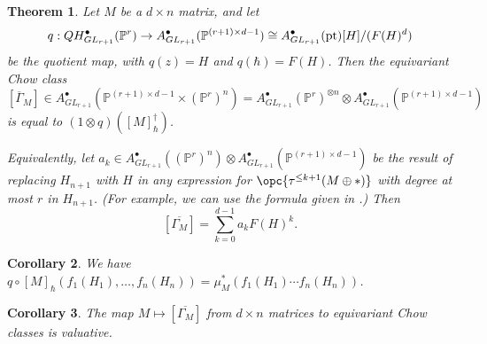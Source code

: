 \documentclass[12pt]{amsart}
\newcommand{\mb}{\mathbb}
\newcommand{\ol}{\overline}
\newcommand{\pt}{{\rm pt}}
\theoremstyle{plain}
\newtheorem{Thm}{Theorem}[section]
\newtheorem{Cor}[Thm]{Corollary}
\theoremstyle{definition}
\theoremstyle{remark}
\begin{document}
\begin{Thm}
\label{PFA}
Let $M$ be a $d \times n$ matrix, and let $$q : QH^\bullet_{GL_{r+1}}(\mb{P}^r) \to A^\bullet_{GL_{r+1}}(\mb{P}^{(r+1)\times d-1})\cong A^\bullet_{GL_{r+1}}(\pt)[H]/(F(H)^d)$$ be the quotient map, with $q(z) = H$ and $q(\hbar) = F(H)$. Then the equivariant Chow class \[[\ol{\Gamma}_M] \in A^\bullet_{GL_{r+1}}(\mb{P}^{(r+1)\times d-1}\times(\mb{P}^r)^n) = A^\bullet_{GL_{r+1}}(\mb{P}^r)^{\otimes n}\otimes A^\bullet_{GL_{r+1}}(\mb{P}^{(r+1)\times d-1})\] is equal to $(1 \otimes q)([M]_\hbar^\dagger)$.

Equivalently, let $a_k \in  A^\bullet_{GL_{r+1}} ((\mb{P}^r)^n)\otimes A^\bullet_{GL_{r+1}}(\mb{P}^{(r+1)\times d-1})$ be the result of replacing $H_{n+1}$ with $H$ in any expression for $\opc{\tau^{\le k+1}(M \oplus \ast)}$ with degree at most $r$ in $H_{n+1}$. (For example, we can use the formula given in .)
Then
$$[\ol{\Gamma_M}]=\sum_{k=0}^{d-1} a_k F(H)^k.$$

\end{Thm}
\begin{Cor}
\label{qcirc}
We have  $q\circ[M]_\hbar(f_1(H_1),\ldots,f_n(H_n))=\mu_M^*(f_1(H_1)\cdots f_n(H_n))$.
\end{Cor}
\begin{Cor}\label{graphvaluative}
The map $M \mapsto [\ol{\Gamma_M}]$ from $d \times n$ matrices to equivariant Chow classes is valuative.
\end{Cor}
\end{document}
